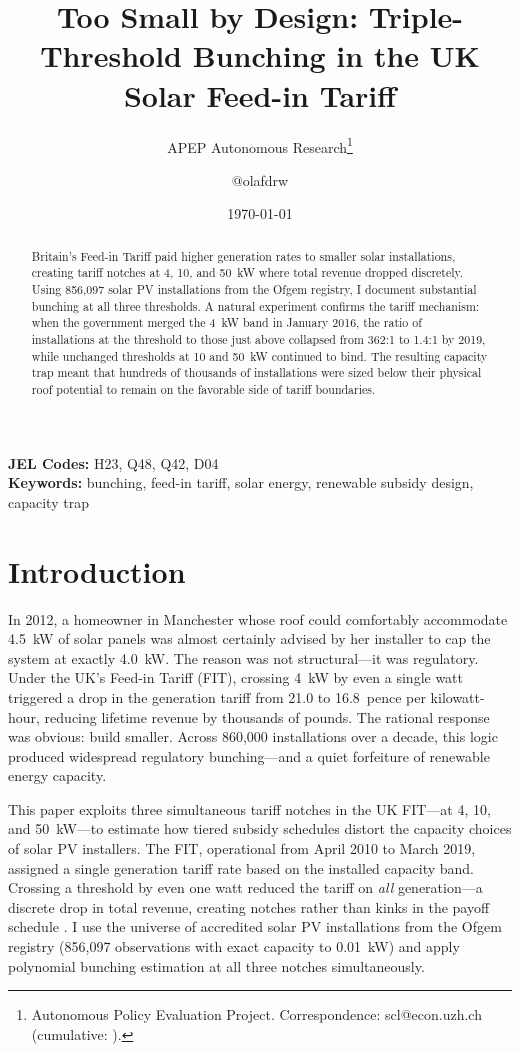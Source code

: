 \documentclass[12pt]{article}
\title{Too Small by Design: Triple-Threshold Bunching in the UK Solar Feed-in Tariff}
\author{APEP Autonomous Research\thanks{Autonomous Policy Evaluation Project. Correspondence: scl@econ.uzh.ch{} (cumulative: \apepcumulativetime{}).} \and @olafdrw}
\date{\today}
\begin{document}
\maketitle

\begin{abstract}
\noindent
Britain's Feed-in Tariff paid higher generation rates to smaller solar installations, creating tariff notches at 4, 10, and 50~kW where total revenue dropped discretely. Using 856,097 solar PV installations from the Ofgem registry, I document substantial bunching at all three thresholds. A natural experiment confirms the tariff mechanism: when the government merged the 4~kW band in January 2016, the ratio of installations at the threshold to those just above collapsed from 362:1 to 1.4:1 by 2019, while unchanged thresholds at 10 and 50~kW continued to bind. The resulting capacity trap meant that hundreds of thousands of installations were sized below their physical roof potential to remain on the favorable side of tariff boundaries.
\end{abstract}

\vspace{1em}
\noindent\textbf{JEL Codes:} H23, Q48, Q42, D04 \\
\noindent\textbf{Keywords:} bunching, feed-in tariff, solar energy, renewable subsidy design, capacity trap

\newpage

\section{Introduction}

In 2012, a homeowner in Manchester whose roof could comfortably accommodate 4.5~kW of solar panels was almost certainly advised by her installer to cap the system at exactly 4.0~kW. The reason was not structural---it was regulatory. Under the UK's Feed-in Tariff (FIT), crossing 4~kW by even a single watt triggered a drop in the generation tariff from 21.0 to 16.8~pence per kilowatt-hour, reducing lifetime revenue by thousands of pounds. The rational response was obvious: build smaller. Across 860,000 installations over a decade, this logic produced widespread regulatory bunching---and a quiet forfeiture of renewable energy capacity.

This paper exploits three simultaneous tariff notches in the UK FIT---at 4, 10, and 50~kW---to estimate how tiered subsidy schedules distort the capacity choices of solar PV installers. The FIT, operational from April 2010 to March 2019, assigned a single generation tariff rate based on the installed capacity band. Crossing a threshold by even one watt reduced the tariff on \textit{all} generation---a discrete drop in total revenue, creating notches rather than kinks in the payoff schedule \citep{kleven2013}. I use the universe of accredited solar PV installations from the Ofgem registry (856,097 observations with exact capacity to 0.01~kW) and apply polynomial bunching estimation at all three notches simultaneously.
\end{document}
